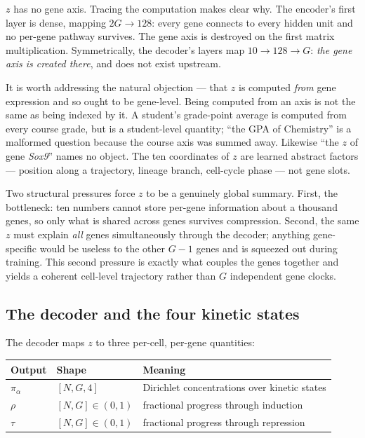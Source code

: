 \documentclass[11pt,a4paper]{article}
\theoremstyle{definition}
\begin{document}
$z$ has no gene axis. Tracing the computation makes clear why. The encoder's
first layer is dense, mapping $2G \to 128$: every gene connects to every hidden
unit and no per-gene pathway survives. The gene axis is destroyed on the first
matrix multiplication. Symmetrically, the decoder's layers map $10 \to 128 \to
G$: \emph{the gene axis is created there}, and does not exist upstream.

It is worth addressing the natural objection --- that $z$ is computed
\emph{from} gene expression and so ought to be gene-level. Being computed from
an axis is not the same as being indexed by it. A student's grade-point average
is computed from every course grade, but is a student-level quantity; ``the GPA
of Chemistry'' is a malformed question because the course axis was summed away.
Likewise ``the $z$ of gene \emph{Sox9}'' names no object. The ten coordinates of
$z$ are learned abstract factors --- position along a trajectory, lineage
branch, cell-cycle phase --- not gene slots.

Two structural pressures force $z$ to be a genuinely global summary. First, the
bottleneck: ten numbers cannot store per-gene information about a thousand
genes, so only what is shared across genes survives compression. Second, the
same $z$ must explain \emph{all} genes simultaneously through the decoder;
anything gene-specific would be useless to the other $G-1$ genes and is
squeezed out during training. This second pressure is exactly what couples the
genes together and yields a coherent cell-level trajectory rather than $G$
independent gene clocks.

\subsection{The decoder and the four kinetic states}

The decoder maps $z$ to three per-cell, per-gene quantities:

\begin{center}
\begin{tabular}{@{}lll@{}}
\toprule
\textbf{Output} & \textbf{Shape} & \textbf{Meaning} \\
\midrule
$\pi_\alpha$ & $[N, G, 4]$ & Dirichlet concentrations over kinetic states \\
$\rho$  & $[N, G] \in (0,1)$ & fractional progress through induction \\
$\tau$  & $[N, G] \in (0,1)$ & fractional progress through repression \\
\bottomrule
\end{tabular}
\end{center}
\end{document}
